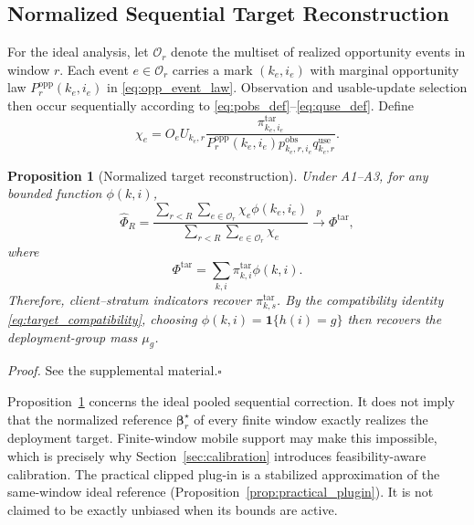 \documentclass[letterpaper,journal]{IEEEtran}
\newtheorem{proposition}{Proposition}
\begin{document}
\subsection{Normalized Sequential Target Reconstruction}
\label{subsec:prop_reconstruction}

For the ideal analysis, let $\mathcal{O}_r$ denote the multiset of realized
opportunity events in window $r$.  Each event $e\in\mathcal{O}_r$ carries a
mark $(k_e,i_e)$ with marginal opportunity law
$P_r^{\mathrm{opp}}(k_e,i_e)$ in \eqref{eq:opp_event_law}.  Observation and
usable-update selection then occur sequentially according to
\eqref{eq:pobs_def}--\eqref{eq:quse_def}.  Define
\begin{equation}
 \chi_e
 =
 O_e U_{k_e,r}
 \frac{
 \pi^{\mathrm{tar}}_{k_e,i_e}
 }{
 P_r^{\mathrm{opp}}(k_e,i_e)
 p^{\mathrm{obs}}_{k_e,r,i_e}
 q^{\mathrm{use}}_{k_e,r}
 }.
 \label{eq:chi_event}
\end{equation}

\begin{proposition}[Normalized target reconstruction]
\label{prop:reconstruction}
Under A1--A3, for any bounded function $\phi(k,i)$,
\begin{equation}
 \widehat\Phi_R
 =
 \frac{
 \sum_{r<R}
 \sum_{e\in\mathcal{O}_r}
 \chi_e\phi(k_e,i_e)
 }{
 \sum_{r<R}
 \sum_{e\in\mathcal{O}_r}
 \chi_e
 }
 \xrightarrow{p}
 \Phi^{\mathrm{tar}},
 \label{eq:hajek_phi}
\end{equation}
where
\begin{equation}
 \Phi^{\mathrm{tar}}
 =
 \sum_{k,i}
 \pi^{\mathrm{tar}}_{k,i}\phi(k,i).
 \label{eq:target_phi}
\end{equation}
Therefore, client--stratum indicators recover
$\pi^{\mathrm{tar}}_{k,s}$.  By the compatibility identity
\eqref{eq:target_compatibility}, choosing
$\phi(k,i)=\mathbf{1}\{h(i)=g\}$ then recovers the deployment-group mass
$\mu_g$.
\end{proposition}

\noindent\emph{Proof.}
See the supplemental material.\hfill$\square$

Proposition~\ref{prop:reconstruction} concerns the ideal pooled sequential
correction.  It does not imply that the normalized reference
$\boldsymbol\beta_r^\star$ of every finite window exactly realizes the
deployment target.  Finite-window mobile support may make this impossible,
which is precisely why Section~\ref{sec:calibration} introduces
feasibility-aware calibration.  The practical clipped plug-in is a
stabilized approximation of the same-window ideal reference
(Proposition~\ref{prop:practical_plugin}).  It is not claimed to be
exactly unbiased when its bounds are active.
\end{document}
